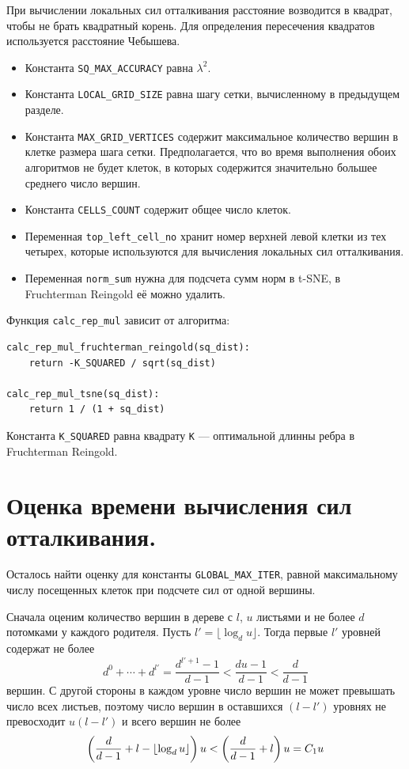 При вычислении локальных сил отталкивания расстояние возводится в квадрат, чтобы не брать квадратный корень.  Для определения пересечения квадратов используется расстояние Чебышева.

\begin{itemize}
\item Константа \texttt{SQ\_MAX\_ACCURACY} равна $\lambda^2$.
\item Константа \texttt{LOCAL\_GRID\_SIZE} равна шагу сетки, вычисленному в предыдущем разделе.
\item Константа \texttt{MAX\_GRID\_VERTICES} содержит максимальное количество вершин в клетке размера шага сетки. Предполагается, что во время выполнения обоих алгоритмов не будет клеток, в которых содержится значительно большее среднего число вершин.
\item Константа  \texttt{CELLS\_COUNT} содержит общее число клеток.
\item Переменная \texttt{top\_left\_cell\_no} хранит номер верхней левой клетки из тех четырех, которые используются для вычисления локальных сил отталкивания.
\item Переменная \texttt{norm\_sum} нужна для подсчета сумм норм в t-SNE, в Fruchterman Reingold её можно удалить.
\end{itemize}

Функция \texttt{calc\_rep\_mul} зависит от алгоритма:
\begin{verbatim}
calc_rep_mul_fruchterman_reingold(sq_dist):
    return -K_SQUARED / sqrt(sq_dist)

calc_rep_mul_tsne(sq_dist):
    return 1 / (1 + sq_dist)
\end{verbatim}

Константа \texttt{K\_SQUARED} равна квадрату \texttt{K} --- оптимальной длинны ребра в Fruchterman Reingold.

\section{Оценка времени вычисления сил отталкивания.}
\label{sec:repulsion_time}

Осталось найти оценку для константы \texttt{GLOBAL\_MAX\_ITER}, равной максимальному числу посещенных клеток при подсчете сил от одной вершины.

Сначала оценим количество вершин в дереве с $l$, $u$ листьями и не более $d$ потомками у каждого родителя. Пусть $l' = \lfloor\log_d u\rfloor$. Тогда первые $l'$ уровней содержат не более
$$d^0 + \cdots + d^{l'} = \frac{d^{l' + 1} - 1}{d - 1} < \frac{d u - 1}{d - 1} < \frac{d}{d - 1}$$
вершин. С другой стороны в каждом уровне число вершин не может превышать число всех листьев, поэтому число вершин в оставшихся $(l - l')$ уровнях не превосходит $u (l - l')$ и всего вершин не более
\begin{equation}
  \left(\frac{d}{d - 1} + l - \lfloor\log_d u\rfloor\right) u < \left(\frac{d}{d - 1} + l\right)u = C_1 u
  \label{eq:leafs_count}
\end{equation}

